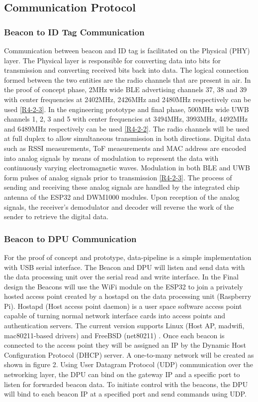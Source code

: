 \pagebreak
\subsection{Communication Protocol}
\subsubsection{Beacon to ID Tag Communication}
\medskip
Communication between beacon and ID tag is facilitated on the Physical (PHY) layer. The Physical layer is responsible for converting data into bits for transmission and converting received bits back into data. The logical connection formed between the two entities are the radio channels that are present in air. In the proof of concept phase, 2MHz wide BLE advertising channels 37, 38 and 39 with center frequencies at 2402MHz, 2426MHz and 2480MHz respectively can be used \ref{R4-2-3}. In the engineering prototype and final phase, 500MHz wide UWB channels 1, 2, 3 and 5 with center frequencies at 3494MHz, 3993MHz, 4492MHz and 6489MHz respectively can be used \ref{R4-2-2}. The radio channels will be used at full duplex to allow simultaneous transmission in both directions. Digital data such as RSSI measurements, ToF measurements and MAC address are encoded into analog signals by means of modulation to represent the data with continuously varying electromagnetic waves. Modulation in both BLE and UWB form pulses of analog signals prior to transmission \ref{R4-2-3}. The process of sending and receiving these analog signals are handled by the integrated chip antenna of the ESP32 and DWM1000 modules. Upon reception of the analog signals, the receiver's demodulator and decoder will reverse the work of the sender to retrieve the digital data. 



\pagebreak
\subsubsection{Beacon to DPU Communication}
\medskip
For the proof of concept and prototype, data-pipeline is a simple implementation with USB serial interface. The Beacon and DPU will listen and send data with the data processing unit over the serial read and write interface. In the Final design the Beacons will use the WiFi module on the ESP32 to join a privately hosted access point created by a hostapd on the data processing unit (Raspberry Pi). Hostapd (Host access point daemon) is a user space software access point capable of turning normal network interface cards into access points and authentication servers. The current version supports Linux (Host AP, madwifi, mac80211-based drivers) and FreeBSD (net80211) \cite{R4-1-2-1}. Once each beacon is connected to the access point they will be assigned an IP by the Dynamic Host Configuration Protocol (DHCP) server. A one-to-many network will be created as shown in figure 2. Using User Datagram Protocol (UDP) communication over the networking layer, the DPU can bind on the gateway IP and a specific port to listen for forwarded beacon data. To initiate control with the beacons, the DPU will bind to each beacon IP at a specified port and send commands using UDP.

